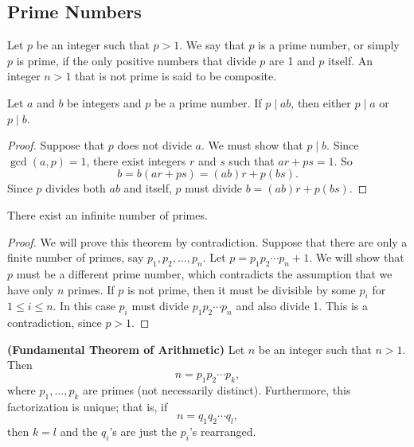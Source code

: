  
\subsection*{Prime Numbers}

Let $p$ be an integer such that $p > 1$.  We say that $p$ is a {\bfi prime number}, or simply $p$ is {\bfi prime}, if the only positive numbers that divide $p$ are 1 and $p$ itself.  An integer $n > 1$ that is not prime is said to be {\bfi composite}.  

\begin{lemma}[Euclid]\label{integers:prime_divisor_theorem}
Let $a$ and $b$ be integers and $p$ be a prime number.  If $p \mid ab$, then either $p \mid a$ or $p \mid b$. 
\end{lemma}

\begin{proof}
Suppose that $p$ does not divide $a$.  We must show that $p \mid b$. Since $\gcd( a, p ) = 1$, there exist integers $r$ and $s$ such that $ar + ps = 1$.  So 
\[
b = b(ar + ps) = (ab)r + p(bs).
\]
Since $p$ divides both $ab$ and itself, $p$ must divide $b = (ab)r + p(bs)$. 
\end{proof}

\begin{theorem}[Euclid]\label{integers_inifinite_primes}
There exist an infinite number of primes.
\end{theorem}

\begin{proof}
We will prove this theorem by contradiction.  Suppose that there are only a finite number of primes, say $p_1, p_2, \ldots, p_n$.  Let $p = p_1  p_2  \cdots  p_n + 1$.  We will show that $p$ must be a different prime number, which contradicts the assumption that we have only $n$ primes.  If $p$ is not prime, then it must be divisible by some $p_i$ for $1 \leq i \leq n$. In this  case $p_i$ must divide $p_1 p_2 \cdots p_n$ and also divide 1.  This is a contradiction, since $p > 1$. 
\end{proof}

\begin{theorem} {\bf (Fundamental Theorem of Arithmetic)} \label{integers_theorem_FTA}
Let $n$ be an integer such that $n > 1$.  Then
\[
n = p_1 p_2 \cdots p_k,
\]
where $p_1, \ldots, p_k$ are  primes (not necessarily distinct).  Furthermore, this factorization is unique; that is, if 
\[
n = q_1 q_2 \cdots q_l,
\]
then $k = l$ and the $q_i$'s are just the $p_i$'s rearranged.
\end{theorem}

